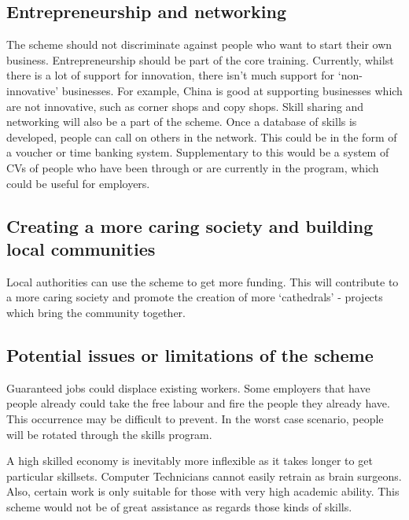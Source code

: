 \documentclass[]{tufte-handout}
\begin{document}
\hypertarget{entrepreneurship-and-networking}{%
\subsection{Entrepreneurship and
networking}\label{entrepreneurship-and-networking}}

The scheme should not discriminate against people who want to start
their own business. Entrepreneurship should be part of the core
training. Currently, whilst there is a lot of support for innovation,
there isn't much support for `non-innovative' businesses. For example,
China is good at supporting businesses which are not innovative, such as
corner shops and copy shops. Skill sharing and networking will also be a
part of the scheme. Once a database of skills is developed, people can
call on others in the network. This could be in the form of a voucher or
time banking system. Supplementary to this would be a system of CVs of
people who have been through or are currently in the program, which
could be useful for employers.

\hypertarget{creating-a-more-caring-society-and-building-local-communities}{%
\subsection{Creating a more caring society and building local
communities}\label{creating-a-more-caring-society-and-building-local-communities}}

Local authorities can use the scheme to get more funding. This will
contribute to a more caring society and promote the creation of more
`cathedrals' - projects which bring the community together.

\hypertarget{potential-issues-or-limitations-of-the-scheme}{%
\subsection{Potential issues or limitations of the
scheme}\label{potential-issues-or-limitations-of-the-scheme}}

Guaranteed jobs could displace existing workers. Some employers that
have people already could take the free labour and fire the people they
already have. This occurrence may be difficult to prevent. In the worst
case scenario, people will be rotated through the skills program.

A high skilled economy is inevitably more inflexible as it takes longer
to get particular skillsets. Computer Technicians cannot easily retrain
as brain surgeons. Also, certain work is only suitable for those with
very high academic ability. This scheme would not be of great assistance
as regards those kinds of skills.
\end{document}
